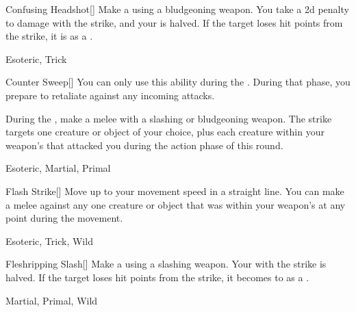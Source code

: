 \lowercase{\hypertarget{maneuver:Confusing Headshot}{}}\label{maneuver:Confusing Headshot}
\hypertarget{maneuver:Confusing Headshot}{}
\begin{freeability}[Rank 4]{Confusing Headshot}[]
Make a  using a bludgeoning weapon.
You take a \minus2d penalty to damage with the strike, and your  is halved.
If the target loses hit points from the strike, it is  as a .


 Esoteric, Trick
\end{freeability}
\vspace{0.25em}



\lowercase{\hypertarget{maneuver:Counter Sweep}{}}\label{maneuver:Counter Sweep}
\hypertarget{maneuver:Counter Sweep}{}
\begin{freeability}[Rank 4]{Counter Sweep}[]
You can only use this ability during the .
During that phase, you prepare to retaliate against any incoming attacks.

During the , make a melee  with a slashing or bludgeoning weapon.
The strike targets one creature or object of your choice,
plus each creature within your weapon's  that attacked you during the action phase of this round.


 Esoteric, Martial, Primal
\end{freeability}
\vspace{0.25em}



\lowercase{\hypertarget{maneuver:Flash Strike}{}}\label{maneuver:Flash Strike}
\hypertarget{maneuver:Flash Strike}{}
\begin{freeability}[Rank 4]{Flash Strike}[]
Move up to your movement speed in a straight line.
You can make a melee  against any one creature or object that was within your weapon's  at any point during the movement.


 Esoteric, Trick, Wild
\end{freeability}
\vspace{0.25em}



\lowercase{\hypertarget{maneuver:Fleshripping Slash}{}}\label{maneuver:Fleshripping Slash}
\hypertarget{maneuver:Fleshripping Slash}{}
\begin{freeability}[Rank 4]{Fleshripping Slash}[]
Make a  using a slashing weapon.
Your  with the strike is halved.
If the target loses hit points from the strike, it becomes  to  as a .


 Martial, Primal, Wild
\end{freeability}
\vspace{0.25em}



